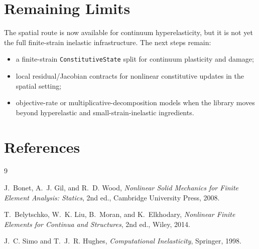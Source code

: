 \section{Remaining Limits}

The spatial route is now available for continuum hyperelasticity, but it is
not yet the full finite-strain inelastic infrastructure. The next steps remain:
\begin{itemize}
  \item a finite-strain \texttt{ConstitutiveState} split for continuum plasticity
        and damage;
  \item local residual/Jacobian contracts for nonlinear constitutive updates in
        the spatial setting;
  \item objective-rate or multiplicative-decomposition models when the library
        moves beyond hyperelastic and small-strain-inelastic ingredients.
\end{itemize}

\section{References}

\begin{thebibliography}{9}

J.~Bonet, A.~J. Gil, and R.~D. Wood,
\emph{Nonlinear Solid Mechanics for Finite Element Analysis: Statics},
2nd ed., Cambridge University Press, 2008.

T.~Belytschko, W.~K. Liu, B.~Moran, and K.~Elkhodary,
\emph{Nonlinear Finite Elements for Continua and Structures},
2nd ed., Wiley, 2014.

J.~C. Simo and T.~J.~R. Hughes,
\emph{Computational Inelasticity},
Springer, 1998.

\end{thebibliography}
